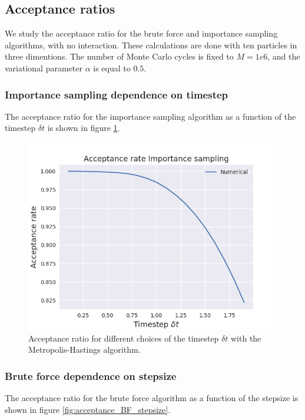 \documentclass[norsk,a4paper,12pt]{article}
\begin{document}
\subsection{Acceptance ratios}
We study the acceptance ratio for the brute force and importance sampling algorithms, with no interaction. These calculations are done with ten particles in three dimentions. The number of Monte Carlo cycles is fixed to $M=1e6$, and the variational parameter $\alpha$ is equal to $0.5$.

\subsubsection{Importance sampling dependence on timestep }
The acceptance ratio for the importance sampling algorithm as a function of the timestep $\delta t$ is shown in figure \ref{fig:acceptance_IS_timestep}. 

\begin{figure} [H]
	\centering
	\includegraphics[scale=0.65]{images/acceptance_IS.png}
	\caption{Acceptance ratio for different choices of the timestep $\delta t$  with the Metropolis-Hastings algorithm.}
	\label{fig:acceptance_IS_timestep}
\end{figure} 

\subsubsection{Brute force dependence on stepsize}
The acceptance ratio for the brute force algorithm as a function of the stepsize is shown in figure \ref{fig:acceptance_BF_stepsize}. 
\end{document}
